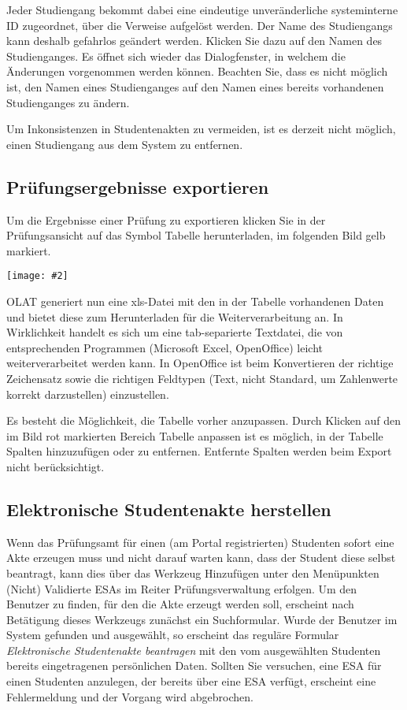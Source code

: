 \documentclass[a4paper,11pt]{article}
\newcommand{\bild}[2]{
    \begin{center}\texttt{[image: \#2]}\end{center}
}
\newcommand{\knopf}[1]{{\sc #1}}
\begin{document}
Jeder Studiengang bekommt dabei eine eindeutige unveränderliche systeminterne
ID zugeordnet, über die Verweise aufgelöst werden. Der Name des Studiengangs
kann deshalb gefahrlos geändert werden. Klicken Sie dazu auf den Namen des
Studienganges. Es öffnet sich wieder das Dialogfenster, in welchem die
Änderungen vorgenommen werden können. Beachten Sie, dass es nicht möglich ist,
den Namen eines Studienganges auf den Namen eines bereits vorhandenen
Studienganges zu ändern.  

Um Inkonsistenzen in Studentenakten zu vermeiden, ist es derzeit nicht
möglich, einen Studiengang aus dem System zu entfernen.

\subsection{Prüfungsergebnisse exportieren}

Um die Ergebnisse einer Prüfung zu exportieren klicken Sie in der
Prüfungsansicht auf das Symbol \knopf{Tabelle herunterladen}, im folgenden
Bild gelb markiert.

\bild{.9}{Ergebnis-Exportieren}

OLAT generiert nun eine xls-Datei mit den in der Tabelle vorhandenen Daten und
bietet diese zum Herunterladen für die Weiterverarbeitung an.  In Wirklichkeit
handelt es sich um eine tab-separierte Textdatei, die von entsprechenden
Programmen (Microsoft Excel, OpenOffice) leicht weiterverarbeitet werden kann.
In OpenOffice ist beim Konvertieren der richtige Zeichensatz sowie die
richtigen Feldtypen (Text, nicht Standard, um Zahlenwerte korrekt
darzustellen) einzustellen.

Es besteht die Möglichkeit, die Tabelle vorher anzupassen. Durch Klicken auf
den im Bild rot markierten Bereich \knopf{Tabelle anpassen} ist es möglich, in
der Tabelle Spalten hinzuzufügen oder zu entfernen. Entfernte Spalten werden
beim Export nicht berücksichtigt.

\subsection{Elektronische Studentenakte herstellen}

Wenn das Prüfungsamt für einen (am Portal registrierten) Studenten sofort eine
Akte erzeugen muss und nicht darauf warten kann, dass der Student diese selbst
beantragt, kann dies über das Werkzeug \knopf{Hinzufügen} unter den
Menüpunkten \knopf{(Nicht) Validierte ESAs} im Reiter
\knopf{Prüfungsverwaltung} erfolgen. Um den Benutzer zu finden, für den die
Akte erzeugt werden soll, erscheint nach Betätigung dieses Werkzeugs zunächst
ein Suchformular. Wurde der Benutzer im System gefunden und ausgewählt, so
erscheint das reguläre Formular {\em Elektronische Studentenakte beantragen}
mit den vom ausgewählten Studenten bereits eingetragenen persönlichen Daten.
Sollten Sie versuchen, eine ESA für einen Studenten anzulegen, der bereits
über eine ESA verfügt, erscheint eine Fehlermeldung und der Vorgang wird
abgebrochen.
\end{document}
